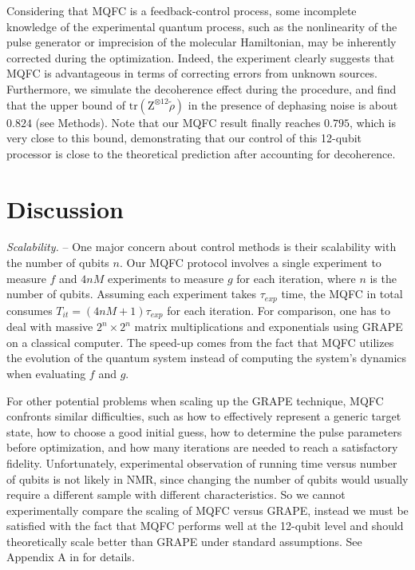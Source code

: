 \documentclass[twocolumn,reprint, amsmath,amssymb,showpacs,superscriptaddress]{revtex4-1}
\newcommand{\tr}{\textrm{tr}}
\begin{document}
Considering that MQFC is a feedback-control process, some incomplete knowledge of the experimental quantum process, such as the nonlinearity of the pulse generator or imprecision of the molecular Hamiltonian, may be inherently corrected during the optimization. Indeed, the experiment clearly suggests that MQFC is advantageous in terms of correcting errors from unknown sources. Furthermore, we simulate the decoherence effect during the procedure, and find that the upper bound of $\tr(\text{Z}^{\otimes 12}\tilde{\rho})$ in the presence of dephasing noise is about $0.824$ (see Methods). Note that our MQFC result finally reaches $0.795$, which is very close to this bound, demonstrating that our control of this 12-qubit processor is close to the theoretical prediction after accounting for decoherence.

\section{Discussion}
\label{sec4}

\emph{Scalability.} -- One major concern about control methods is their scalability with the number of qubits $n$.   Our MQFC protocol involves a single experiment to measure $f$ and $4nM$ experiments to measure $g$ for each iteration, where $n$ is the number of qubits. Assuming each experiment takes $\tau_{exp}$ time, the MQFC in total consumes $T_{it}=  (4nM+1)\tau_{exp}$ for each iteration. For comparison, one has to deal with massive $2^n\times2^n$ matrix multiplications and exponentials using GRAPE on a classical computer. The speed-up comes from the fact that MQFC utilizes the evolution of the quantum system instead of computing the system's dynamics when evaluating $f$ and $g$.

For  other potential problems when scaling up the GRAPE technique, MQFC confronts similar difficulties, such as how to effectively represent a generic target state, how to choose a good initial guess, how to determine the pulse parameters before optimization, and how many iterations are needed to reach a satisfactory fidelity. Unfortunately, experimental observation of  running time versus number of qubits is not likely in NMR, since changing the number of qubits would usually require a different sample with different characteristics. So we cannot experimentally compare the scaling of MQFC versus GRAPE, instead we must be satisfied with the fact that MQFC performs well at the 12-qubit level and should theoretically scale better than GRAPE under standard assumptions. See Appendix A in \cite{supple} for details.
\end{document}
